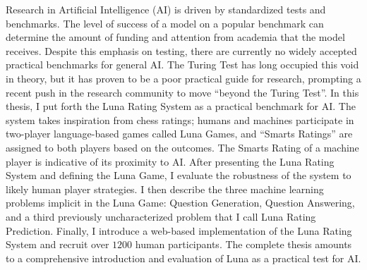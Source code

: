 
Research in Artificial Intelligence (AI) is driven by standardized tests and benchmarks. The level of success of a model on a popular benchmark can determine the amount of funding and attention from academia that the model receives. Despite this emphasis on testing, there are currently no widely accepted practical benchmarks for general AI. The Turing Test has long occupied this void in theory, but it has proven to be a poor practical guide for research, prompting a recent push in the research community to move ``beyond the Turing Test''. In this thesis, I put forth the Luna Rating System as a practical benchmark for AI. The system takes inspiration from chess ratings; humans and machines participate in two-player language-based games called Luna Games, and ``Smarts Ratings'' are assigned to both players based on the outcomes. The Smarts Rating of a machine player is indicative of its proximity to AI. After presenting the Luna Rating System and defining the Luna Game, I evaluate the robustness of the system to likely human player strategies. I then describe the three machine learning problems implicit in the Luna Game: Question Generation, Question Answering, and a third previously uncharacterized problem that I call Luna Rating Prediction. Finally, I introduce a web-based implementation of the Luna Rating System and recruit over $1200$ human participants. The complete thesis amounts to a comprehensive introduction and evaluation of Luna as a practical test for AI.